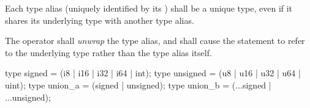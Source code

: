 \specsubsubitem
Each type alias (uniquely identified by its ) shall be
a unique type, even if it shares its underlying type with another type alias.

\specsubsubitem
The  operator shall \textit{unwrap} the type alias, and shall
cause the statement to refer to the underlying type rather than the type alias
itself.


\begin{codesample}
type signed = (i8 | i16 | i32 | i64 | int);
type unsigned = (u8 | u16 | u32 | u64 | uint);
type union_a = (signed | unsigned);
type union_b = (...signed | ...unsigned);
\end{codesample}
